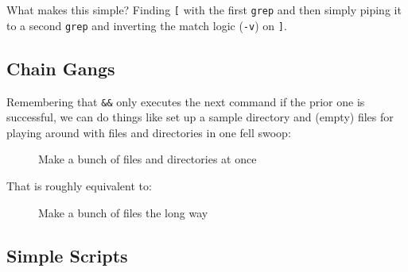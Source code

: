 \documentclass[10pt,american,]{book}
\newenvironment{Shaded}{\begin{snugshade}}{\end{snugshade}}
\newcommand{\KeywordTok}[1]{\textcolor[rgb]{0.13,0.29,0.53}{\textbf{{#1}}}}
\newcommand{\NormalTok}[1]{{#1}}
\numberwithin{figure}{chapter}
\DeclareRobustCommand{\drcap}[1]{\begin{figure}[H]\caption{#1}\end{figure}}
\renewcommand{\KeywordTok}[1]{{#1}}
\renewcommand{\NormalTok}[1]{{#1}}
\begin{document}
What makes this simple? Finding \texttt{{[}} with the first
\texttt{grep} and then simply piping it to a second \texttt{grep} and
inverting the match logic (\texttt{-v}) on \texttt{{]}}.

\subsection*{Chain Gangs}\label{chain-gangs}

Remembering that \texttt{\&\&} only executes the next command if the
prior one is successful, we can do things like set up a sample directory
and (empty) files for playing around with files and directories in one
fell swoop: 

\drcap{Make a bunch of files and directories at once}

\begin{Shaded}
\end{Shaded}

That is roughly equivalent to:

\drcap{Make a bunch of files the long way}

\begin{Shaded}
\end{Shaded}

\subsection*{Simple Scripts}\label{simple-scripts}
\end{document}
